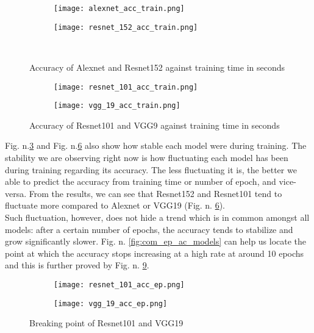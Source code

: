 \begin{figure}[h]
     \begin{subfigure}{0.5\textwidth}
	    \texttt{[image: alexnet\_acc\_train.png]}
         \label{fig:alexnet_acc_train}
     \end{subfigure}
     \hfill
     \begin{subfigure}{0.5\textwidth}
	    \texttt{[image: resnet\_152\_acc\_train.png]}
        \label{fig:resnet_152_acc_train}
     \end{subfigure}\\
     \caption{Accuracy of Alexnet and Resnet152 against training time in seconds}
        \label{fig:sing_acc_train2}
\end{figure}
\begin{figure}[h]
     \begin{subfigure}{0.5\textwidth}
	    \texttt{[image: resnet\_101\_acc\_train.png]}
        \label{fig:resnet_1o1_acc_train}
     \end{subfigure}
     \begin{subfigure}{0.5\textwidth}
	    \texttt{[image: vgg\_19\_acc\_train.png]}
        \label{fig:vgg_19_acc_train}
     \end{subfigure}
        \caption{Accuracy of Resnet101 and VGG9 against training time in seconds}
        \label{fig:sing_acc_train}
\end{figure}
Fig. n.\ref{fig:sing_acc_train2} and Fig. n.\ref{fig:sing_acc_train} also show how stable each model were during training. The stability we are observing right now is how fluctuating each model has been during training regarding its accuracy. The less fluctuating it is, the better we able to predict the accuracy from training time or number of epoch, and vice-versa. From the results, we can see that Resnet152 and Resnet101 tend to fluctuate more compared to Alexnet or VGG19 (Fig. n. \ref{fig:sing_acc_train}). \\
Such fluctuation, however, does not hide a trend which is in common amongst all models: after a certain number of epochs, the accuracy tends to stabilize and grow significantly slower. Fig. n. \ref{fig:com_ep_ac_models} can help us locate the point at which the accuracy stops increasing at a high rate at around 10 epochs and this is further proved by Fig. n. \ref{fig:sing_acc_ep}.\\
\begin{figure}[h]
     \begin{subfigure}{0.5\textwidth}
	    \texttt{[image: resnet\_101\_acc\_ep.png]}
        \label{fig:resnet_101_acc_ep}
     \end{subfigure}
     \begin{subfigure}{0.5\textwidth}
	    \texttt{[image: vgg\_19\_acc\_ep.png]}
        \label{fig:vgg_19_acc_ep}
     \end{subfigure}
        \caption{Breaking point of Resnet101 and VGG19}
        \label{fig:sing_acc_ep}
\end{figure}\\



